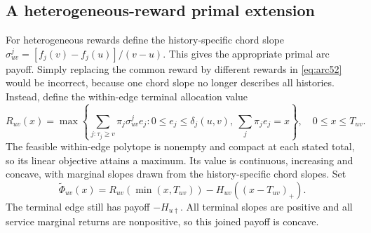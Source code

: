\documentclass[11pt,letterpaper]{article}
\theoremstyle{definition}\newtheorem{remark}[theorem]{Remark}
\begin{document}
\subsection{A heterogeneous-reward primal extension}\label{sec:packing54}
For heterogeneous rewards define the history-specific chord slope $\sigma^j_{uv}=[f_j(v)-f_j(u)]/(v-u)$. This gives the appropriate primal arc payoff. Simply replacing the common reward by different rewards in \eqref{eq:arc52} would be incorrect, because one chord slope no longer describes all histories. Instead, define the within-edge terminal allocation value
\begin{equation}\label{eq:terminalprofile54}
 R_{uv}(x)=\max\left\{\sum_{j:\tau_j\geq v}\pi_j\sigma^j_{uv}e_j:
 0\leq e_j\leq\delta_j(u,v),\ \sum_j\pi_je_j=x\right\},\quad 0\leq x\leq T_{uv}.
\end{equation}
The feasible within-edge polytope is nonempty and compact at each stated total, so its linear objective attains a maximum. Its value is continuous, increasing and concave, with marginal slopes drawn from the history-specific chord slopes. Set
\begin{equation}\label{eq:heteroarc54}
 \widetilde\Phi_{uv}(x)=R_{uv}(\min(x,T_{uv}))-H_{uv}((x-T_{uv})_+).
\end{equation}
The terminal edge still has payoff $-H_{u\dagger}$. All terminal slopes are positive and all service marginal returns are nonpositive, so this joined payoff is concave.
\end{document}
